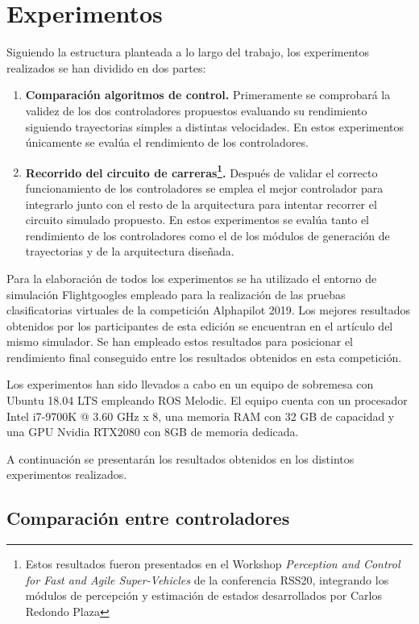 \chapter{Experimentos}
Siguiendo la estructura planteada a lo largo del trabajo, los experimentos realizados se han dividido en dos partes:
\begin{enumerate}
	\item \textbf{Comparación algoritmos de control.}
	Primeramente se comprobará la validez de los dos controladores propuestos evaluando su rendimiento siguiendo trayectorias simples a distintas velocidades. En estos experimentos únicamente se evalúa el rendimiento de los controladores.
	
	\item \textbf{Recorrido del circuito de carreras\footnote{Estos resultados fueron presentados en el Workshop  \textit{Perception and Control for Fast and Agile Super-Vehicles} de la conferencia RSS20, integrando los módulos de percepción y estimación de estados desarrollados por Carlos Redondo Plaza}.} Después de validar el correcto funcionamiento de los controladores se emplea el mejor controlador para integrarlo junto con el resto de la arquitectura para intentar recorrer el circuito simulado propuesto. En estos experimentos se evalúa tanto el rendimiento de los controladores como el de los módulos de generación de trayectorias y de la arquitectura diseñada.
\end{enumerate} 

Para la elaboración de todos los experimentos se ha utilizado el entorno de simulación Flightgoogles \cite{guerra2019flightgoggles} empleado para la realización de las pruebas clasificatorias virtuales de la competición Alphapilot 2019. Los mejores resultados obtenidos por los participantes de esta edición se encuentran en el artículo del mismo simulador. Se han empleado estos resultados para posicionar el rendimiento final conseguido entre los resultados obtenidos en esta competición.

Los experimentos han sido llevados a cabo en un equipo de sobremesa con Ubuntu 18.04 LTS empleando ROS Melodic. El equipo cuenta con un procesador Intel i7-9700K @ 3.60 GHz x 8, una memoria RAM con 32 GB de capacidad y una GPU Nvidia RTX2080 con 8GB de memoria dedicada.


A continuación se presentarán los resultados obtenidos en los distintos experimentos realizados.

\newpage
\section{Comparación entre controladores}


